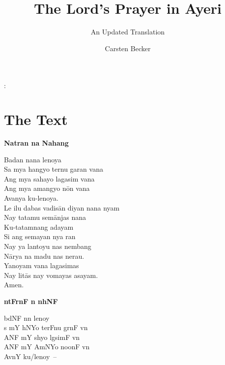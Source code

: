 \documentclass[12pt,paper=a4]{scrartcl}
\author{Carsten Becker}
\title{The Lord's Prayer in Ayeri}
\subtitle{An Updated Translation}
\newenvironment{ayeri}{
    \Tagati
}{
}
\newenvironment{mytitle}{
    \hfill
    \begin{minipage}{0.667\textwidth}
	\vspace{\baselineskip}
	\begin{center}
	    \Large
	    \sffamily\bfseries
	    \makeatletter
}{
	    \makeatother
	\end{center}
	\vspace{1em}
    \end{minipage}
    \hfill
}
\begin{document}

\begin{mytitle}
    \@title: \@subtitle
\end{mytitle}

\section{The Text}
\begin{raggedright}
\begin{multicols}{2}
\textbf{Natran na Nahang} \\ [0.5\baselineskip]

\begin{linenumbers*}

Badan nana lenoya \\
Sa mya hangyo ternu garan vana \\
Ang mya sahayo lagasim vana \\
Ang mya amangyo nōn vana \\
Avanya ku-lenoya. \\ [0.5\baselineskip]

Le ilu dabas vadisān diyan nana nyam \\
Nay tatamu semānjas nana \\
Ku-tatamnang adayam \\
Si ang semayan nya ran \\
Nay ya lantoyu nas nembang \\
Nārya na madu nas nerau. \\ [0.5\baselineskip]

Yanoyam vana lagasimas \\
Nay litās nay vomayas asayam. \\ [0.5\baselineskip]

Amen.

\end{linenumbers*}

\columnbreak

\begin{ayeri}
\textbf{ntFrnF n nhNF} \\ [0.5\baselineskip]

\begin{linenumbers*}

bdNF nn lenoy \\
s mY hNYo terFnu grnF vn \\
ANF mY shyo lgsimF vn \\
ANF mY AmNYo noonF vn \\
AvnY ku/lenoy~– \\ [0.5\baselineskip]


\end{linenumbers*}
\end{ayeri}
\end{multicols}
\end{raggedright}
\end{document}
